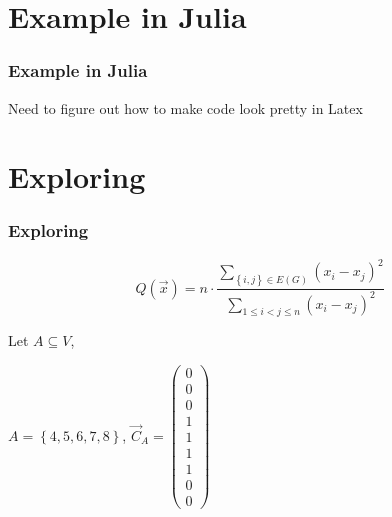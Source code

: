 \documentclass{beamer}
\begin{document}
\section{Example in Julia}
\begin{frame}
\frametitle{\textbf{Example in Julia} }

Need to figure out how to make code look pretty in Latex

\end{frame}


\section{Exploring}
\begin{frame}
\frametitle{\textbf{Exploring} }

\begin{equation*}
    Q\left(\vec{x}\right) = n \cdot \frac{ \sum_{\left\{i,j\right\} \in E\left(G\right) } \left(x_{i}-x_{j}\right)^2}{ \sum_{1 \leq i < j \leq n} \left(x_{i}-x_{j}\right)^2}
\end{equation*}

Let $A \subseteq V$, 

$A = \left\{4,5,6,7,8\right\}$, $\vec{C}_A = 
\begin{pmatrix} 
    0 \\ 
    0 \\ 
    0 \\ 
    1 \\
    1 \\
    1 \\
    1 \\
    0 \\
    0
\end{pmatrix}
$

\end{frame}

\end{document}
